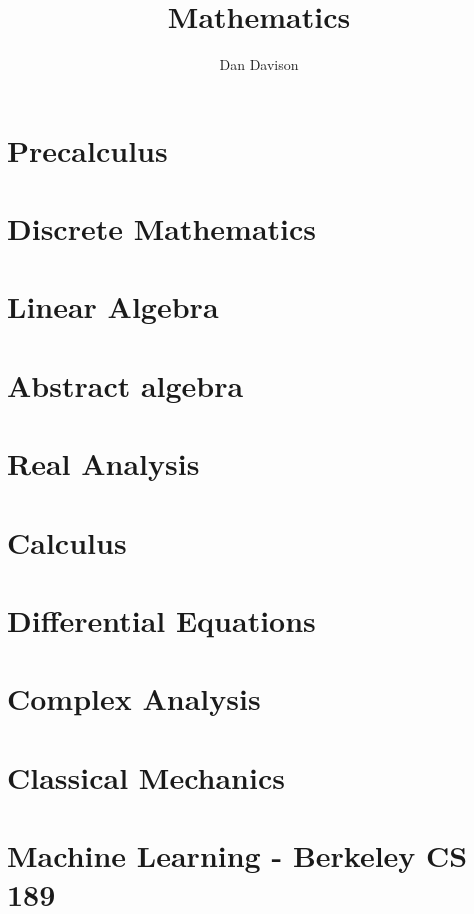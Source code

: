 \documentclass{book}
\title{Mathematics}
\author{Dan Davison}
\begin{document}
\frontmatter
\maketitle
\tableofcontents
\mainmatter


\chapter{Precalculus}


\chapter{Discrete Mathematics}


\chapter{Linear Algebra}


\chapter{Abstract algebra}


\chapter{Real Analysis}


\chapter{Calculus}



\chapter{Differential Equations}


\chapter{Complex Analysis}


\chapter{Classical Mechanics}


\chapter{Machine Learning - Berkeley CS 189}


\end{document}
